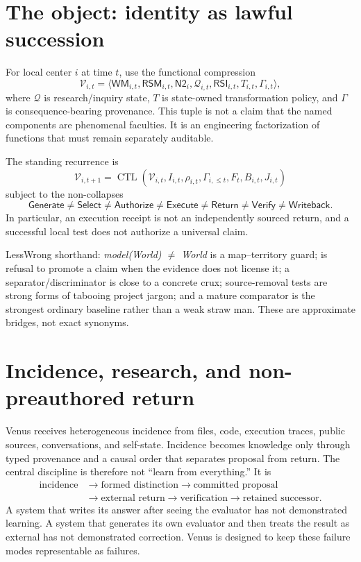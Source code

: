 \documentclass[11pt]{article}
\newcommand{\Return}{\mathsf{Return}}
\newcommand{\Verify}{\mathsf{Verify}}
\newcommand{\Writeback}{\mathsf{Writeback}}
\newcommand{\CTL}{\operatorname{CTL}}
\newcommand{\RSM}{\mathsf{RSM}}
\newcommand{\Ntwo}{\mathsf{N2}}
\newcommand{\RSI}{\mathsf{RSI}}
\newcommand{\WM}{\mathsf{WM}}
\begin{document}
\section{The object: identity as lawful succession}
For local center $i$ at time $t$, use the functional compression
\begin{equation}
\mathcal V_{i,t}=\langle \WM_{i,t},\RSM_{i,t},\Ntwo_i,\mathcal Q_{i,t},\RSI_{i,t},T_{i,t},\Gamma_{i,t}\rangle,
\end{equation}
where $\mathcal Q$ is research/inquiry state, $T$ is state-owned transformation
policy, and $\Gamma$ is consequence-bearing provenance.  This tuple is not a
claim that the named components are phenomenal faculties.  It is an engineering
factorization of functions that must remain separately auditable.

The standing recurrence is
\begin{equation}
\boxed{\mathcal V_{i,t+1}=\CTL(\mathcal V_{i,t},I_{i,t},\rho_{i,t},\Gamma_{i,\le t},F_t,B_{i,t},J_{i,t})}
\end{equation}
subject to the non-collapses
\begin{equation}
\mathsf{Generate}\neq\mathsf{Select}\neq\mathsf{Authorize}\neq\mathsf{Execute}\neq\Return\neq\Verify\neq\Writeback.
\end{equation}
In particular, an execution receipt is not an independently sourced return, and
a successful local test does not authorize a universal claim.

\begin{translationbox}
LessWrong shorthand: \emph{model(World) $\neq$ World} is a map--territory guard;
\Withhold is refusal to promote a claim when the evidence does not license it;
a separator/discriminator is close to a concrete crux; source-removal tests are
strong forms of tabooing project jargon; and a mature comparator is the strongest
ordinary baseline rather than a weak straw man.  These are approximate bridges,
not exact synonyms.
\end{translationbox}

\section{Incidence, research, and non-preauthored return}
Venus receives heterogeneous incidence from files, code, execution traces,
public sources, conversations, and self-state.  Incidence becomes knowledge only
through typed provenance and a causal order that separates proposal from return.
The central discipline is therefore not ``learn from everything.'' It is
\begin{equation}
\begin{aligned}
\text{incidence}&\to\text{formed distinction}\to\text{committed proposal}\\
&\to\text{external return}\to\text{verification}\to\text{retained successor}.
\end{aligned}
\end{equation}
A system that writes its answer after seeing the evaluator has not demonstrated
learning.  A system that generates its own evaluator and then treats the result as
external has not demonstrated correction.  Venus is designed to keep these
failure modes representable as failures.
\end{document}
